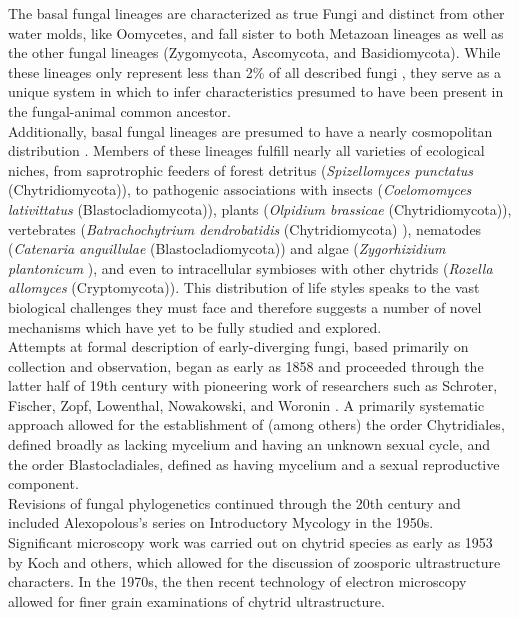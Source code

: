 \indent The basal fungal lineages are characterized as true Fungi and distinct from other water molds, like Oomycetes, and fall sister to both Metazoan lineages as well as the other fungal lineages (Zygomycota, Ascomycota, and Basidiomycota). While these lineages only represent less than 2\% of all described fungi \cite{Stajich2009}, they serve as a unique system in which to infer characteristics presumed to have been present in the fungal-animal common ancestor.\\
\indent Additionally, basal fungal lineages are presumed to have a nearly cosmopolitan distribution \cite{Powell1993}. Members of these lineages fulfill nearly all varieties of ecological niches, from saprotrophic feeders of forest detritus (\textit{Spizellomyces punctatus} (Chytridiomycota)), to pathogenic associations with insects (\textit{Coelomomyces lativittatus} (Blastocladiomycota)), plants (\textit{Olpidium brassicae} (Chytridiomycota)), vertebrates (\textit{Batrachochytrium dendrobatidis} (Chytridiomycota) \cite{Longcore1999}), nematodes (\textit{Catenaria anguillulae} (Blastocladiomycota)) and algae (\textit{Zygorhizidium plantonicum} \cite{Canter1967}), and even to intracellular symbioses with other chytrids (\textit{Rozella allomyces} (Cryptomycota)). This distribution of life styles speaks to the vast biological challenges they must face and therefore suggests a number of novel mechanisms which have yet to be fully studied and explored. \\
\indent Attempts at formal description of early-diverging fungi, based primarily on collection and observation, began as early as 1858 and proceeded through the latter half of 19th century with pioneering work of researchers such as Schroter, Fischer, Zopf, Lowenthal, Nowakowski, and Woronin \cite{lwerPhycomyces}. A primarily systematic approach allowed for the establishment of (among others) the order Chytridiales, defined broadly as lacking mycelium and having an unknown sexual cycle, and the order Blastocladiales, defined as having mycelium and a sexual reproductive component.\\
\indent Revisions of fungal phylogenetics continued through the 20th century and included Alexopolous's series on Introductory Mycology in the 1950s.\\
\indent Significant microscopy work was carried out on chytrid species as early as 1953 by Koch and others, which allowed for the discussion of zoosporic ultrastructure characters. In the 1970s, the then recent technology of electron microscopy allowed for finer grain examinations of chytrid ultrastructure.\\

